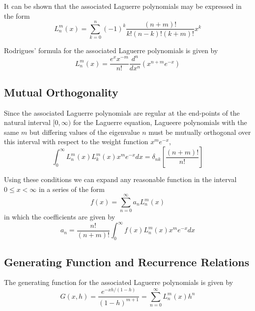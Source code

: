 \documentclass[12pt, a4paper, oneside, openright, titlepage]{book}
\begin{document}
It can be shown that the associated Laguerre polynomials may be expressed in the form \begin{equation*}
    L_n^m(x) = \sum_{k=0}^n(-1)^k\frac{(n+m)!}{k!(n-k)!(k+m)!}x^k
\end{equation*}

\begin{thm}
    Rodrigues' formula for the associated Laguerre polynomials is given by \begin{equation*}
        L_n^m(x) = \frac{e^xx^{-m}}{n!}\frac{d^n}{dx^n}(x^{n+m}e^{-x})
    \end{equation*}
\end{thm}

\subsection{Mutual Orthogonality}

Since the associated Laguerre polynomials are regular at the end-points of the natural interval $[0,\infty)$ for the Laguerre equation, Lagueere polynomials with the same $m$ but differing values of the eigenvalue $n$ must be mutually orthogonal over this interval with respect to the weight function $x^me^{-x}$, \begin{equation*}
    \int_{0}^{\infty}L_n^m(x)L_k^m(x)x^me^{-x}dx = \delta_{nk}\left[\frac{(n+m)!}{n!}\right]
\end{equation*}

Using these conditions we can expand any reasonable function in the interval $0 \leq x < \infty$ in a series of the form \begin{equation*}
    f(x) = \sum_{n=0}^{\infty}a_nL_n^m(x)
\end{equation*}
in which the coefficients are given by \begin{equation*}
    a_n = \frac{n!}{(n+m)!}\int_0^{\infty}f(x)L_n^m(x)x^me^{-x}dx
\end{equation*}

\subsection{Generating Function and Recurrence Relations}

\begin{defn}
    The generating function for the associated Laguerre polynomials is given by \begin{equation}
        G(x,h) = \frac{e^{-xh/(1-h)}}{(1-h)^{m+1}} = \sum_{n=0}^{\infty}L_n^m(x)h^n
    \end{equation}
\end{defn}
\end{document}
